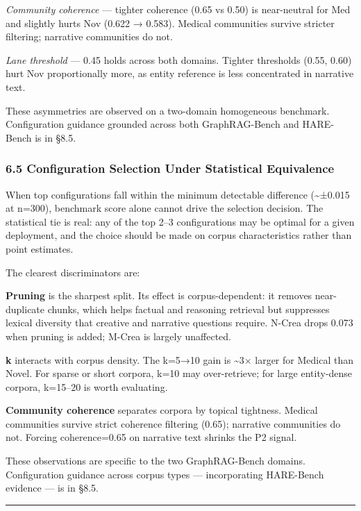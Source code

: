\documentclass[
]{article}
\begin{document}
\emph{Community coherence} --- tighter coherence (0.65 vs 0.50) is
near-neutral for Med and slightly hurts Nov (0.622 → 0.583). Medical
communities survive stricter filtering; narrative communities do not.

\emph{Lane threshold} --- 0.45 holds across both domains. Tighter
thresholds (0.55, 0.60) hurt Nov proportionally more, as entity
reference is less concentrated in narrative text.

These asymmetries are observed on a two-domain homogeneous benchmark.
Configuration guidance grounded across both GraphRAG-Bench and
HARE-Bench is in §8.5.

\subsubsection{6.5 Configuration Selection Under Statistical
Equivalence}\label{configuration-selection-under-statistical-equivalence}

When top configurations fall within the minimum detectable difference
(\textasciitilde±0.015 at n=300), benchmark score alone cannot drive the
selection decision. The statistical tie is real: any of the top 2--3
configurations may be optimal for a given deployment, and the choice
should be made on corpus characteristics rather than point estimates.

The clearest discriminators are:

\textbf{Pruning} is the sharpest split. Its effect is corpus-dependent:
it removes near-duplicate chunks, which helps factual and reasoning
retrieval but suppresses lexical diversity that creative and narrative
questions require. N-Crea drops 0.073 when pruning is added; M-Crea is
largely unaffected.

\textbf{k} interacts with corpus density. The k=5→10 gain is
\textasciitilde3× larger for Medical than Novel. For sparse or short
corpora, k=10 may over-retrieve; for large entity-dense corpora,
k=15--20 is worth evaluating.

\textbf{Community coherence} separates corpora by topical tightness.
Medical communities survive strict coherence filtering (0.65); narrative
communities do not. Forcing coherence=0.65 on narrative text shrinks the
P2 signal.

These observations are specific to the two GraphRAG-Bench domains.
Configuration guidance across corpus types --- incorporating HARE-Bench
evidence --- is in §8.5.

\begin{center}\rule{0.5\linewidth}{0.5pt}\end{center}
\end{document}
